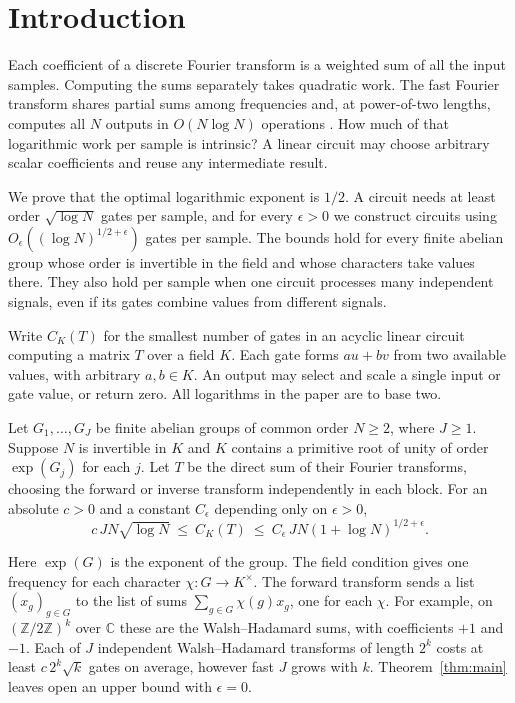 \section{Introduction}\label{sec:intro}

Each coefficient of a discrete Fourier transform is a weighted sum of
all the input samples. Computing the sums separately takes quadratic
work. The fast Fourier transform shares partial sums among frequencies
and, at power-of-two lengths, computes all $N$ outputs in
$O(N\log N)$ operations \cite{CooleyTukey}. How much of that
logarithmic work per sample is intrinsic? A linear circuit may choose
arbitrary scalar coefficients and reuse any intermediate result.

We prove that the optimal logarithmic exponent is $1/2$. A circuit
needs at least order $\sqrt{\log N}$ gates per sample, and for every
$\epsilon>0$ we construct circuits using
$O_\epsilon((\log N)^{1/2+\epsilon})$ gates per sample. The bounds hold for every finite abelian group whose order is
invertible in the field and whose characters take values there. They
also hold per sample when one circuit processes many independent
signals, even if its gates combine values from different signals.

Write $C_K(T)$ for the smallest number of gates in an acyclic linear
circuit computing a matrix $T$ over a field $K$. Each gate forms
$au+bv$ from two available values, with arbitrary $a,b\in K$. An
output may select and scale a single input or gate value, or return
zero. All logarithms in the paper are to base two.

\begin{theorem}\label{thm:main}
Let $G_1,\ldots,G_J$ be finite abelian groups of common order $N\ge2$,
where $J\ge1$. Suppose $N$ is invertible in $K$ and $K$ contains a
primitive root of unity of order $\exp(G_j)$ for each $j$. Let $T$ be
the direct sum of their Fourier transforms, choosing the forward or
inverse transform independently in each block. For an absolute $c>0$
and a constant $C_\epsilon$ depending only on $\epsilon>0$,
\[
 c\,JN\sqrt{\log N}\ \le\ C_K(T)\
            \le\ C_\epsilon\,JN(1+\log N)^{1/2+\epsilon}.
\]
\end{theorem}

Here $\exp(G)$ is the exponent of the group. The field condition gives
one frequency for each character $\chi:G\to K^\times$. The forward
transform sends a list $(x_g)_{g\in G}$ to the list of sums
$\sum_{g\in G}\chi(g)x_g$, one for each $\chi$. For example, on
$(\mathbb Z/2\mathbb Z)^k$ over $\mathbb C$ these are the
Walsh--Hadamard sums, with coefficients $+1$ and $-1$. Each of $J$
independent Walsh--Hadamard transforms of length $2^k$ costs at least
$c\,2^k\sqrt{k}$ gates on average, however fast $J$ grows with $k$.
Theorem~\ref{thm:main} leaves open an upper bound with $\epsilon=0$.

